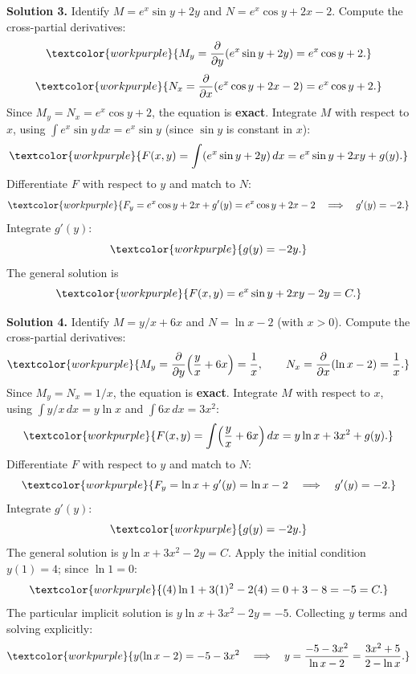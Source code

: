 \medskip

\noindent\textbf{Solution 3.}\quad
Identify $M = e^x\sin y + 2y$ and $N = e^x\cos y + 2x - 2$.
Compute the cross-partial derivatives:
\[
  \textcolor{workpurple}{M_y
  = \frac{\partial}{\partial y}(e^x\sin y + 2y)
  = e^x\cos y + 2.}
\]
\[
  \textcolor{workpurple}{N_x
  = \frac{\partial}{\partial x}(e^x\cos y + 2x - 2)
  = e^x\cos y + 2.}
\]
Since $M_y = N_x = e^x\cos y + 2$, the equation is \textbf{exact}.
Integrate $M$ with respect to $x$, using $\int e^x\sin y\,dx = e^x\sin y$
(since $\sin y$ is constant in $x$):
\[
  \textcolor{workpurple}{F(x,y)
  = \int(e^x\sin y + 2y)\,dx
  = e^x\sin y + 2xy + g(y).}
\]
Differentiate $F$ with respect to $y$ and match to $N$:
\[
  \textcolor{workpurple}{F_y = e^x\cos y + 2x + g'(y)
  = e^x\cos y + 2x - 2
  \quad\Longrightarrow\quad g'(y) = -2.}
\]
Integrate $g'(y)$:
\[
  \textcolor{workpurple}{g(y) = -2y.}
\]
The general solution is
\[
  \textcolor{workpurple}{F(x,y) = e^x\sin y + 2xy - 2y = C.}
\]

\medskip

\noindent\textbf{Solution 4.}\quad
Identify $M = y/x + 6x$ and $N = \ln x - 2$ (with $x>0$).
Compute the cross-partial derivatives:
\[
  \textcolor{workpurple}{M_y
  = \frac{\partial}{\partial y}\!\left(\frac{y}{x} + 6x\right)
  = \frac{1}{x},
  \qquad
  N_x
  = \frac{\partial}{\partial x}(\ln x - 2)
  = \frac{1}{x}.}
\]
Since $M_y = N_x = 1/x$, the equation is \textbf{exact}.
Integrate $M$ with respect to $x$, using $\int y/x\,dx = y\ln x$ and
$\int 6x\,dx = 3x^2$:
\[
  \textcolor{workpurple}{F(x,y)
  = \int\!\left(\frac{y}{x} + 6x\right)dx
  = y\ln x + 3x^2 + g(y).}
\]
Differentiate $F$ with respect to $y$ and match to $N$:
\[
  \textcolor{workpurple}{F_y = \ln x + g'(y) = \ln x - 2
  \quad\Longrightarrow\quad g'(y) = -2.}
\]
Integrate $g'(y)$:
\[
  \textcolor{workpurple}{g(y) = -2y.}
\]
The general solution is $y\ln x + 3x^2 - 2y = C$.
Apply the initial condition $y(1) = 4$; since $\ln 1 = 0$:
\[
  \textcolor{workpurple}{(4)\ln 1 + 3(1)^2 - 2(4)
  = 0 + 3 - 8 = -5 = C.}
\]
The particular implicit solution is $y\ln x + 3x^2 - 2y = -5$.
Collecting $y$ terms and solving explicitly:
\[
  \textcolor{workpurple}{y(\ln x - 2) = -5 - 3x^2
  \quad\Longrightarrow\quad
  y = \frac{-5 - 3x^2}{\ln x - 2} = \frac{3x^2 + 5}{2 - \ln x}.}
\]

\medskip

